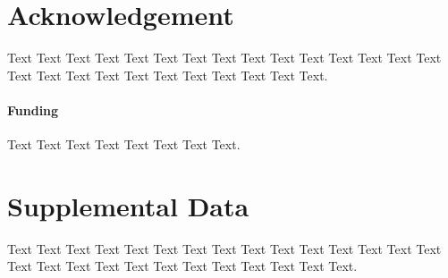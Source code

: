 \documentclass{frontiersSCNS} %
\begin{document}
\section*{Acknowledgement}
Text Text Text Text Text Text  Text Text Text Text Text Text Text Text  Text Text Text Text Text Text Text Text Text  Text Text Text.

\paragraph{Funding\textcolon} Text Text Text Text Text Text  Text Text.

\section*{Supplemental Data}
Text Text Text Text Text Text  Text Text Text Text Text Text Text Text Text  Text Text Text Text Text Text Text Text Text  Text Text Text.


\end{document}

